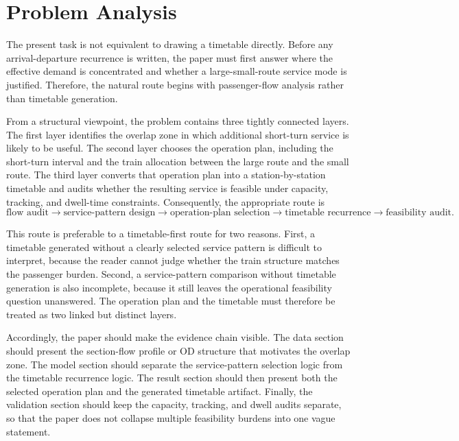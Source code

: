 \section{Problem Analysis}

The present task is not equivalent to drawing a timetable directly. Before any arrival-departure recurrence is written, the paper must first answer where the effective demand is concentrated and whether a large-small-route service mode is justified. Therefore, the natural route begins with passenger-flow analysis rather than timetable generation.

From a structural viewpoint, the problem contains three tightly connected layers. The first layer identifies the overlap zone in which additional short-turn service is likely to be useful. The second layer chooses the operation plan, including the short-turn interval and the train allocation between the large route and the small route. The third layer converts that operation plan into a station-by-station timetable and audits whether the resulting service is feasible under capacity, tracking, and dwell-time constraints. Consequently, the appropriate route is
\[
\text{flow audit} \rightarrow \text{service-pattern design} \rightarrow \text{operation-plan selection} \rightarrow \text{timetable recurrence} \rightarrow \text{feasibility audit}.
\]

This route is preferable to a timetable-first route for two reasons. First, a timetable generated without a clearly selected service pattern is difficult to interpret, because the reader cannot judge whether the train structure matches the passenger burden. Second, a service-pattern comparison without timetable generation is also incomplete, because it still leaves the operational feasibility question unanswered. The operation plan and the timetable must therefore be treated as two linked but distinct layers.

Accordingly, the paper should make the evidence chain visible. The data section should present the section-flow profile or OD structure that motivates the overlap zone. The model section should separate the service-pattern selection logic from the timetable recurrence logic. The result section should then present both the selected operation plan and the generated timetable artifact. Finally, the validation section should keep the capacity, tracking, and dwell audits separate, so that the paper does not collapse multiple feasibility burdens into one vague statement.
